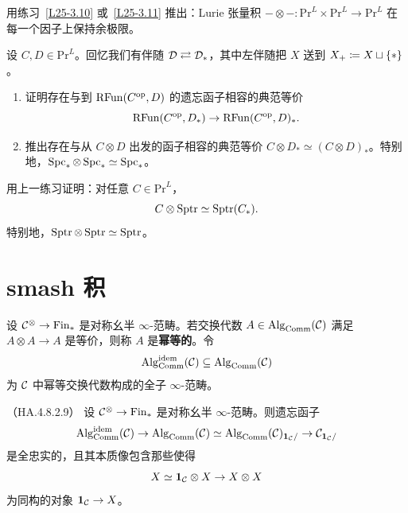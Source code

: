 \begin{exercise}\label{L25-3.12}
用练习~\ref{L25-3.10} 或~\ref{L25-3.11} 推出：Lurie 张量积 $-\otimes-\colon\mathrm{Pr}^{L}\times\mathrm{Pr}^{L}\to\mathrm{Pr}^{L}$ 在每一个因子上保持余极限。
\end{exercise}

\begin{exercise}\label{L25-3.13}
设 $C,D\in\mathrm{Pr}^{L}$。回忆我们有伴随 $\mathcal{D}\rightleftarrows\mathcal{D}_{*}$，其中左伴随把 $X$ 送到 $X_{+}\coloneqq X\sqcup\{*\}$。
\begin{enumerate}[label=(\arabic*),leftmargin=2.4em,itemsep=0.1em]
\item 证明存在与到 $\mathrm{RFun}(C^{\mathrm{op}},D)$ 的遗忘函子相容的典范等价
\[
\mathrm{RFun}(C^{\mathrm{op}},D_{*})\to\mathrm{RFun}(C^{\mathrm{op}},D)_{*}.
\]
\item 推出存在与从 $C\otimes D$ 出发的函子相容的典范等价 $C\otimes D_{*}\simeq(C\otimes D)_{*}$。特别地，$\operatorname{Spc}_{*}\otimes\operatorname{Spc}_{*}\simeq\operatorname{Spc}_{*}$。
\end{enumerate}
\end{exercise}

\begin{exercise}\label{L25-3.14}
用上一练习证明：对任意 $C\in\mathrm{Pr}^{L}$，
\[
C\otimes\operatorname{Sptr}\simeq\operatorname{Sptr}(C_{*}).
\]
特别地，$\operatorname{Sptr}\otimes\operatorname{Sptr}\simeq\operatorname{Sptr}$。
\end{exercise}

\section{smash 积}

\begin{definition}\label{L25-4.1}
设 $\mathcal{C}^{\otimes}\to\mathrm{Fin}_{*}$ 是对称幺半 $\infty$-范畴。若交换代数 $A\in\operatorname{Alg}_{\mathrm{Comm}}(\mathcal{C})$ 满足 $A\otimes A\to A$ 是等价，则称 $A$ 是\textbf{幂等的}。令
\[
\operatorname{Alg}^{\mathrm{idem}}_{\mathrm{Comm}}(\mathcal{C})\subseteq\operatorname{Alg}_{\mathrm{Comm}}(\mathcal{C})
\]
为 $\mathcal{C}$ 中幂等交换代数构成的全子 $\infty$-范畴。
\end{definition}

\begin{proposition}\label{L25-4.2}（HA.4.8.2.9）
设 $\mathcal{C}^{\otimes}\to\mathrm{Fin}_{*}$ 是对称幺半 $\infty$-范畴。则遗忘函子
\[
\operatorname{Alg}^{\mathrm{idem}}_{\mathrm{Comm}}(\mathcal{C})\to\operatorname{Alg}_{\mathrm{Comm}}(\mathcal{C})\simeq\operatorname{Alg}_{\mathrm{Comm}}(\mathcal{C})_{\mathbf{1}_{\mathcal{C}}/}\to\mathcal{C}_{\mathbf{1}_{\mathcal{C}}/}
\]
是全忠实的，且其本质像包含那些使得
\[
X\simeq\mathbf{1}_{\mathcal{C}}\otimes X\to X\otimes X
\]
为同构的对象 $\mathbf{1}_{\mathcal{C}}\to X$。
\end{proposition}

